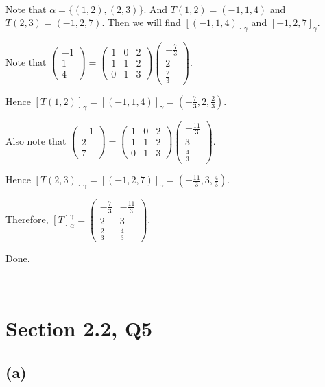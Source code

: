 \documentclass[12pt]{article}%
\begin{document}
~\ 

Note that $\alpha=\{(1,2),(2,3)\}.$ And $T(1,2)=(-1,1,4)$ and $T(2,3)=(-1,2,7).$ Then we will find $[(-1,1,4)]_\gamma$ and $[-1,2,7]_\gamma.$

Note that $\begin{pmatrix}-1\\1\\4 \end{pmatrix}=\begin{pmatrix}1 & 0 & 2\\1 & 1& 2\\0&1&3\end{pmatrix} \begin{pmatrix} -\frac{7}{3}\\2\\\frac{2}{3} \end{pmatrix}.$

Hence $[T(1,2)]_\gamma = [(-1,1,4)]_\gamma = (-\frac{7}{3},2,\frac{2}{3}).$

Also note that $\begin{pmatrix}-1\\2\\7 \end{pmatrix}=\begin{pmatrix}1 & 0 & 2\\1 & 1& 2\\0&1&3\end{pmatrix} \begin{pmatrix} -\frac{11}{3}\\3\\\frac{4}{3} \end{pmatrix}.$ 

Hence $[T(2,3)]_\gamma = [(-1,2,7)]_\gamma = (-\frac{11}{3},3,\frac{4}{3}).$

Therefore, $[T]_\alpha^{\gamma}=\begin{pmatrix}-\frac{7}{3} & -\frac{11}{3} \\2 & 3\\\frac{2}{3} &\frac{4}{3}\end{pmatrix}.$ 

Done.

~\ 

\section{Section 2.2, Q5}

\subsection{(a)}
\end{document}
